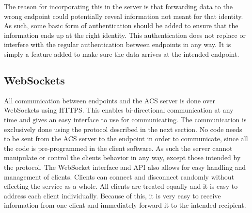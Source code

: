 		The reason for incorporating this in the server is that forwarding data to the wrong endpoint could potentially reveal information not meant for that identity. As such, some basic form of authentication should be added to ensure that the information ends up at the right identity. This authentication does not replace or interfere with the regular authentication between endpoints in any way. It is simply a feature added to make sure the data arrives at the intended endpoint.
	\subsection{WebSockets}
	\label{sec:acsws}
		All communication between endpoints and the ACS server is done over WebSockets using HTTPS. This enables bi-directional communication at any time and gives an easy interface to use for communicating. The communication is exclusively done using the protocol described in the next section. No code needs to be sent from the ACS server to the endpoint in order to communicate, since all the code is pre-programmed in the client software. As such the server cannot manipulate or control the clients behavior in any way, except those intended by the protocol. The WebSocket interface and API also allows for easy handling and management of clients. Clients can connect and disconnect randomly without effecting the service as a whole. All clients are treated equally and it is easy to address each client individually. Because of this, it is very easy to receive information from one client and immediately forward it to the intended recipient. 

